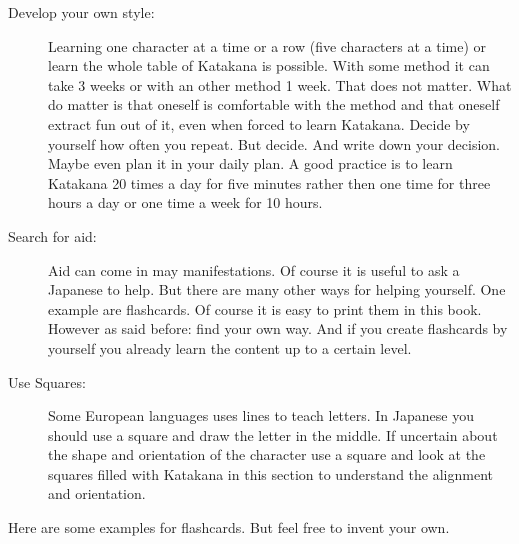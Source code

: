 \begin{description}

\item[Develop your own style:] Learning one character at a time or a row (five
characters at a time) or learn the whole table of Katakana is possible. With
some method it can take 3 weeks or with an other method 1 week. That does not
matter. What do matter is that oneself is comfortable with the method and that
oneself extract fun out of it, even when forced to learn Katakana. Decide by
yourself how often you repeat. But decide. And write down your decision. Maybe
even plan it in your daily plan. A good practice is to learn Katakana 20 times
a day for five minutes rather then one time for three hours a day or one time a
week for 10 hours.

\item[Search for aid:] Aid can come in may manifestations. Of course it is
useful to ask a Japanese to help. But there are many other ways for helping
yourself.  One example are flashcards. Of course it is easy to print them in
this book. However as said before: find your own way. And if you create
flashcards by yourself you already learn the content up to a certain level.

\item[Use Squares:] Some European languages uses lines to teach letters. In
Japanese you should use a square and draw the letter in the middle. If
uncertain about the shape and orientation of the character use a square and
look at the squares filled with Katakana in this section to understand the
alignment and orientation.

\end{description}

\newpage

Here are some examples for flashcards. But feel free to invent your own.


